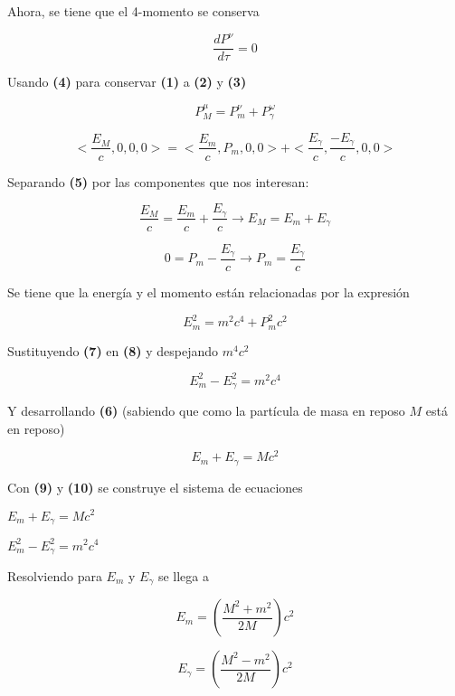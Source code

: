 \documentclass{FR16}
\begin{document}
Ahora, se tiene que el 4-momento se conserva

\begin{equation}
    \frac{dP^\nu}{d\tau} = 0
\end{equation}

Usando \textbf{(4)} para conservar \textbf{(1)} a \textbf{(2)} y \textbf{(3)}

\begin{equation*}
    P^\mu_M = P^\nu_m + P^\omega_\gamma
\end{equation*}

\begin{equation}
    <\frac{E_M}{c}, 0, 0, 0> = <\frac{E_m}{c}, P_m, 0, 0> + <\frac{E_\gamma}{c}, \frac{-E_\gamma}{c}, 0, 0>
\end{equation}

Separando \textbf{(5)} por las componentes que nos interesan:

\begin{equation}
    \frac{E_M}{c} = \frac{E_m}{c} + \frac{E_\gamma}{c} \longrightarrow E_M = E_m + E_\gamma
\end{equation}


\begin{equation}
    0 = P_m - \frac{E_\gamma}{c} \longrightarrow P_m = \frac{E_\gamma}{c}
\end{equation}


Se tiene que la energ\'ia y el momento est\'an relacionadas por la expresi\'on

\begin{equation}
    E^2_m = m^2c^4 + P^2_mc^2
\end{equation}

Sustituyendo \textbf{(7)} en \textbf{(8)} y despejando $m^4c^2$

\begin{equation}
    E^2_m - E^2_\gamma = m^2c^4
\end{equation}

Y desarrollando \textbf{(6)} (sabiendo que como la part\'icula de masa en reposo $M$ est\'a en reposo)

\begin{equation}
    E_m + E_\gamma = Mc^2
\end{equation}{}

Con \textbf{(9)} y \textbf{(10)} se construye el sistema de ecuaciones

\begin{center}
    $E_m + E_\gamma = Mc^2$
    
    
    $E^2_m - E^2_\gamma = m^2c^4$
\end{center}

Resolviendo para $E_m$ y $E_\gamma$ se llega a

\begin{equation*}
    E_m = (\frac{M^2 + m^2}{2M})c^2
\end{equation*}    
 
\begin{equation*}{}   
    E_\gamma = (\frac{M^2 - m^2}{2M})c^2
\end{equation*}
\end{document}
